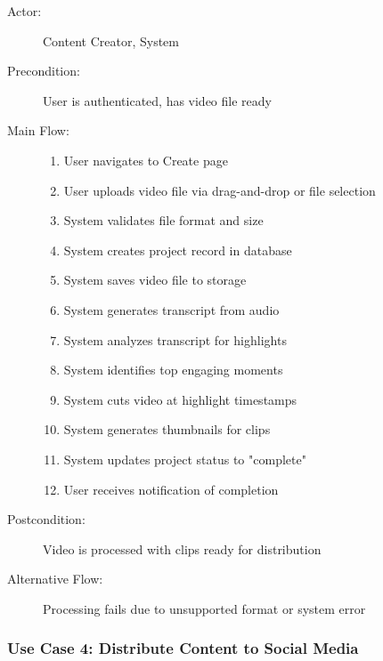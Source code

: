 \begin{description}
    \item[Actor:] Content Creator, System
    \item[Precondition:] User is authenticated, has video file ready
    \item[Main Flow:] 
    \begin{enumerate}
        \item User navigates to Create page
        \item User uploads video file via drag-and-drop or file selection
        \item System validates file format and size
        \item System creates project record in database
        \item System saves video file to storage
        \item System generates transcript from audio
        \item System analyzes transcript for highlights
        \item System identifies top engaging moments
        \item System cuts video at highlight timestamps
        \item System generates thumbnails for clips
        \item System updates project status to "complete"
        \item User receives notification of completion
    \end{enumerate}
    \item[Postcondition:] Video is processed with clips ready for distribution
    \item[Alternative Flow:] Processing fails due to unsupported format or system error
\end{description}

\subsubsection{Use Case 4: Distribute Content to Social Media}

